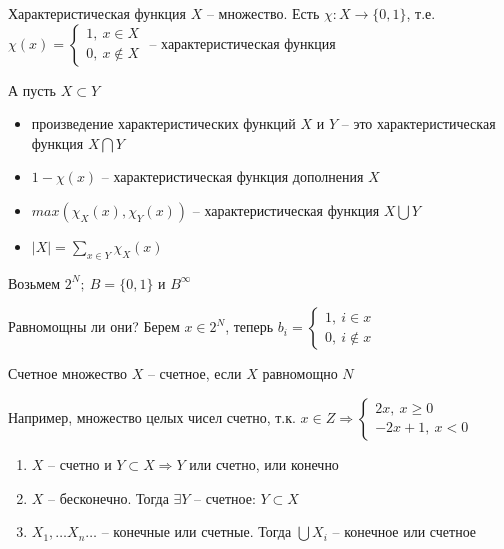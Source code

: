 \documentclass[12pt]{article}
\begin{document}
\begin{defin}{Характеристическая функция}
    $X$ -- множество. Есть $\chi : X \rightarrow \{0, 1\}$, т.е. $\chi(x) = \begin{cases}
        1,\ x \in X \\
        0,\ x \not\in X
    \end{cases}$ -- характеристическая функция
\end{defin}

А пусть $X \subset Y$

\begin{itemize}
    \item произведение характеристических функций $X$ и $Y$ -- это характеристическая функция $X \bigcap Y$
    \item $1 - \chi(x)$ -- характеристическая функция дополнения $X$
    \item $max(\chi_X(x), \chi_Y(x))$ -- характеристическая функция $X \bigcup Y$
    \item $|X| = \sum\limits_{x \in Y} \chi_X(x)$
\end{itemize}

\begin{Example}{}
    Возьмем $2^N;\ B = \{ 0, 1 \}$ и $B^\infty$

    Равномощны ли они? Берем $x \in 2^N$, теперь $b_i = \begin{cases}
        1,\ i \in x \\
        0,\ i \not\in x
    \end{cases}$
\end{Example}

\begin{defin}{Счетное множество}
    $X$ -- счетное, если $X$ равномощно $N$
\end{defin}

\begin{Example}{}
    Например, множество целых чисел счетно, т.к. $x \in Z \Rightarrow \begin{cases}
        2x,\ x \geq 0 \\
        -2x + 1,\ x < 0
    \end{cases}$
\end{Example}

\begin{propos}{}
    \begin{enumerate}
        \item $X$ -- счетно и $Y \subset X \Rightarrow Y$ или счетно, или конечно
        \item $X$ -- бесконечно. Тогда $\exists Y$ -- счетное: $Y \subset X$
        \item $X_1, \ldots X_n \ldots$ -- конечные или счетные. Тогда $\bigcup X_i$ -- конечное или счетное
    \end{enumerate}
\end{propos}
\end{document}
